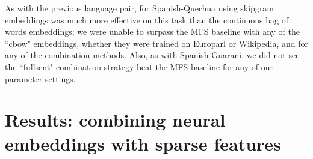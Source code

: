 As with the previous language pair, for Spanish-Quechua using skipgram
embeddings was much more effective on this task than the continuous bag of
words embeddings; we were unable to surpass the MFS baseline with any of the
``cbow" embeddings, whether they were trained on Europarl or Wikipedia, and for
any of the combination methods. Also, as with Spanish-Guaraní, we did not see
the ``fullsent" combination strategy beat the MFS baseline for any of our
parameter settings.


\section{Results: combining neural embeddings with sparse features}

